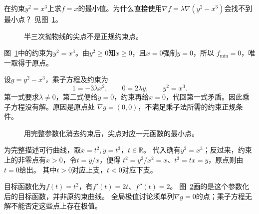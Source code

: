 \begin{exercise}[约束梯度失效的点]\label{ex:c3-h6}
在约束$y^2=x^3$上求$f=x$的最小值。为什么直接使用$\nabla f=\lambda\nabla(y^2-x^3)$会找不到最小点？ 见图~\ref{fig:c3-h6-q}。
\end{exercise}

\begin{figure}[H]\centering
{}
\caption{半三次抛物线的尖点不是正规约束点。}\label{fig:c3-h6-q}
\end{figure}
\begin{solution}
图~\ref{fig:c3-h6-q}中的约束为$y^2=x^3$。由$y^2\ge0$知$x\ge0$，且$x=0$强制$y=0$，所以
$\boxed{f_{\min}=0}$，唯一取得于原点。

设$g=y^2-x^3$，乘子方程及约束为
\[
 1=-3\lambda x^2,\qquad 0=2\lambda y,\qquad y^2=x^3.
\]
第一式要求$\lambda\ne0$，第二式便给$y=0$，约束再给$x=0$，代回第一式矛盾。因此乘子方程没有解。原因是原点处
$\nabla g=(0,0)$，不满足乘子法所需的约束正规条件。
\begin{figure}[H]\centering
{}
\caption{用完整参数化消去约束后，尖点对应一元函数的最小点。}\label{fig:c3-h6-s}
\end{figure}
为完整描述可行曲线，取$x=t^2,y=t^3$，$t\in\mathbb R$。
代入确有$y^2=x^3$；反过来，约束上的非零点有$x>0$，令$t=y/x$，便得
$t^2=y^2/x^2=x$、$t^3=tx=y$，原点则由$t=0$给出。
其中$t>0$对应上支，$t<0$对应下支。

目标函数化为$f(t)=t^2$，有$f'(t)=2t$、$f''(t)=2$。
图~\ref{fig:c3-h6-s}画的是这个参数化后的目标函数，并非原约束曲线。
全局极值讨论须单列$\nabla g=0$的点；乘子方程无解不能否定这些点上存在极值。
\end{solution}



